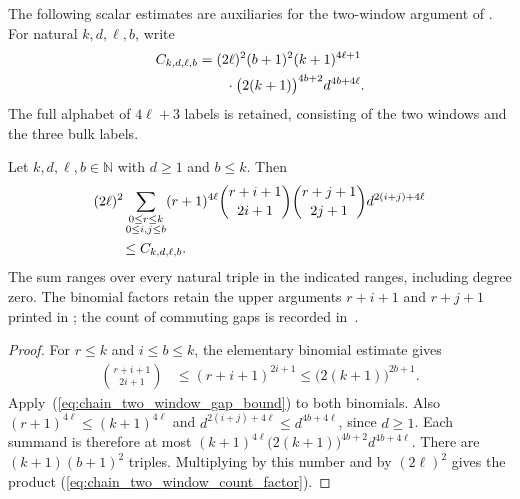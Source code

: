The following scalar estimates are auxiliaries for the two-window argument
of \cite[Proposition~5.7]{Arad2016RigorousRG}. For natural
$k,d,\ell,b$, write
\begin{align}
    C_{k,d,\ell,b}
     & =(2\ell)^2(b+1)^2(k+1)^{4\ell+1}\notag            \\
     & \qquad\cdot\bigl(2(k+1)\bigr)^{4b+2}d^{4b+4\ell}.
    \label{eq:chain_two_window_count_factor}
\end{align}
The full alphabet of $4\ell+3$ labels is retained, consisting of the two
windows and the three bulk labels.

\begin{lemma}
    \label{thm:chain_two_window_count_sum}
    \leanok
    Let $k,d,\ell,b\in\mathbb N$ with $d\ge1$ and $b\le k$. Then
    \begin{align}
         & (2\ell)^2
        \sum_{\substack{0\le r\le k  \\0\le i,j\le b}}
        (r+1)^{4\ell}
        \binom{r+i+1}{2i+1}\binom{r+j+1}{2j+1}
        d^{2(i+j)+4\ell}\notag       \\
         & \qquad\le C_{k,d,\ell,b}.
        \label{eq:chain_two_window_count_sum}
    \end{align}
    The sum ranges over every natural triple in the indicated ranges,
    including degree zero. The binomial factors retain the upper arguments
    $r+i+1$ and $r+j+1$ printed in
    \cite[Proposition~5.7]{Arad2016RigorousRG}; the count of commuting gaps
    is recorded in~\cite{gap:aklv13_interpolation_and_word_count}.
\end{lemma}
\begin{proof}\leanok
    For $r\le k$ and $i\le b\le k$, the elementary binomial estimate gives
    \begin{align}
        \binom{r+i+1}{2i+1}
         & \le (r+i+1)^{2i+1}
        \le\bigl(2(k+1)\bigr)^{2b+1}.
        \label{eq:chain_two_window_gap_bound}
    \end{align}
    Apply~(\ref{eq:chain_two_window_gap_bound}) to both binomials.
    Also $(r+1)^{4\ell}\le(k+1)^{4\ell}$ and
    $d^{2(i+j)+4\ell}\le d^{4b+4\ell}$, since $d\ge1$.
    Each summand is therefore at most
    $(k+1)^{4\ell}\bigl(2(k+1)\bigr)^{4b+2}d^{4b+4\ell}$.
    There are $(k+1)(b+1)^2$ triples. Multiplying by this number and by
    $(2\ell)^2$ gives the product
    (\ref{eq:chain_two_window_count_factor}).
\end{proof}

